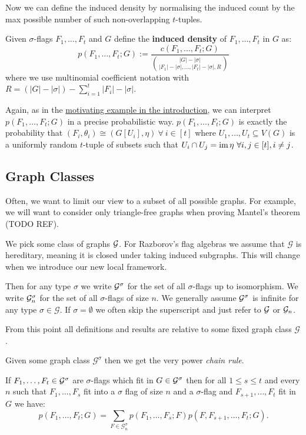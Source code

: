 Now we can define the induced density by normalising the induced count by the max
possible number of such non-overlapping $t$-tuples.

\begin{definition}
    \label{def:induced_density}
    Given $\sigma$-flags $F_1, \dots, F_t$ and $G$ define the \textbf{induced density} of
    $F_1, \dots, F_t$ in $G$ as:
    \[
    p(F_1, \dots, F_t; G)
    := \frac{c(F_1, \dots, F_t; G)}{
    \binom{|G|-|\sigma|}{|F_1|-|\sigma|, \dots,|F_t|-|\sigma|, R}}
    \]
    where we use multinomial coefficient notation with
    $R=(|G|-|\sigma|)-\sum_{i=1}^t |F_i|-|\sigma|$.
\end{definition}

\begin{note}
    Again, as in the \hyperref[sec:motivating_example]{motivating example in the introduction},
    we can interpret $p(F_1, \dots, F_t; G)$ in a precise probabilistic way.
    $p(F_1, \dots, F_t; G)$ is exactly the probability that
    $(F_i, \theta_i) \cong (G[U_i], \eta)\ \forall\ i\in[t]$ where
    $U_1, \dots, U_t \subseteq V(G)$ is a uniformly random $t$-tuple of subsets such that
    $U_i \cap U_j = \im \eta\ \forall i, j \in [t], i \neq j$.
\end{note}

\subsection{Graph Classes}

Often, we want to limit our view to a subset of all possible graphs. For example, we
will want to consider only triangle-free graphs when proving Mantel's theorem (TODO REF).

We pick some class of graphs $\mathcal{G}$. For Razborov's flag algebras we assume that
$\mathcal{G}$ is hereditary, meaning it is closed under taking induced subgraphs. This will change
when we introduce our new local framework.

Then for any type $\sigma$ we write $\mathcal{G}^\sigma$ for the set of all $\sigma$-flags up to
isomorphism. We write $\mathcal{G}^\sigma_n$ for the set of all $\sigma$-flags of size $n$.
We generally assume $\mathcal{G}^\sigma$ is infinite for any type $\sigma\in\mathcal{G}$.
If $\sigma=\emptyset$ we often skip the superscript and just refer to
$\mathcal{G}$ or $\mathcal{G}_n$.

From this point all definitions and results are relative to some fixed graph class
$\mathcal{G}$.

Given some graph class $\mathcal{G}^\sigma$ then we get the very power \textit{chain rule}.
\begin{lemma}
    \label{lemma:chain_rule}
    If $F_1, \dots, F_t \in \mathcal{G}^\sigma$ are $\sigma$-flags which fit in $G\in\mathcal{G}^\sigma$
    then for all $1 \leq s \leq t$ and every $n$ such that
    $F_1, \dots, F_s$ fit into a $\sigma$ flag of size $n$ and a
    $\sigma$-flag and $F_{s+1}, \dots, F_t$ fit in $G$ we have:
    \[
    p(F_1, \dots, F_t; G) = \sum_{F \in \mathcal{G}^\sigma_n}
    p(F_1, \dots, F_s; F)p(F, F_{s+1}, \dots, F_t; G).
    \]
\end{lemma}


